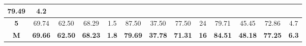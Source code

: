 \begin{table}[H]
{\begin{tabular}{c|cccc|cccc|cccc|}
			\multicolumn{1}{c|}{79.49} &
			4.2 \\ \hline
			\multicolumn{1}{|c|}{\textbf{5}} &
			\multicolumn{1}{c|}{69.74} &
			\multicolumn{1}{c|}{62.50} &
			\multicolumn{1}{c|}{68.29} &
			1.5 &
			\multicolumn{1}{c|}{87.50} &
			\multicolumn{1}{c|}{37.50} &
			\multicolumn{1}{c|}{77.50} &
			24 &
			\multicolumn{1}{c|}{79.71} &
			\multicolumn{1}{c|}{45.45} &
			\multicolumn{1}{c|}{72.86} &
			4.7 \\ \hline
			\multicolumn{1}{|c|}{{\color[HTML]{00009B} \textbf{M}}} &
			\multicolumn{1}{c|}{{\color[HTML]{00009B} \textbf{69.66}}} &
			\multicolumn{1}{c|}{{\color[HTML]{00009B} \textbf{62.50}}} &
			\multicolumn{1}{c|}{{\color[HTML]{00009B} \textbf{68.23}}} &
			{\color[HTML]{00009B} \textbf{1.8}} &
			\multicolumn{1}{c|}{{\color[HTML]{00009B} \textbf{79.69}}} &
			\multicolumn{1}{c|}{{\color[HTML]{00009B} \textbf{37.78}}} &
			\multicolumn{1}{c|}{{\color[HTML]{00009B} \textbf{71.31}}} &
			{\color[HTML]{00009B} \textbf{16}} &
			\multicolumn{1}{c|}{{\color[HTML]{00009B} \textbf{84.51}}} &
			\multicolumn{1}{c|}{{\color[HTML]{00009B} \textbf{48.18}}} &
			\multicolumn{1}{c|}{{\color[HTML]{00009B} \textbf{77.25}}} &
			{\color[HTML]{00009B} \textbf{6.3}} \\ \hline
		\end{tabular}%
	}
\end{table}